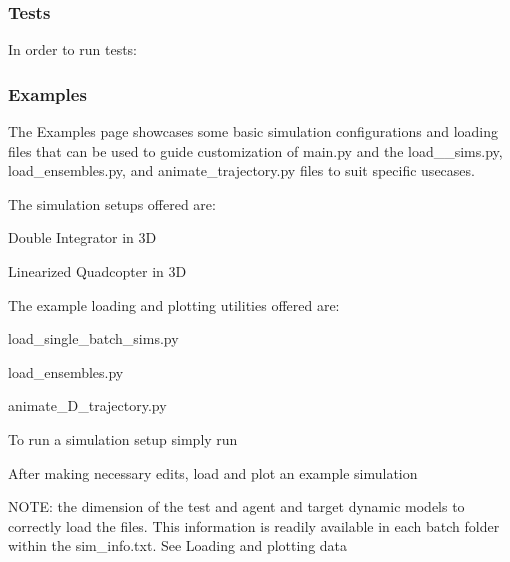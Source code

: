 \subsubsection*{Tests}

In order to run tests\+:


\begin{DoxyCode}{0}
\end{DoxyCode}


\subsubsection*{Examples}

The Examples page showcases some basic simulation configurations and loading files that can be used to guide customization of main.\+py and the load\+\_\+\+\_\+sims.\+py, load\+\_\+ensembles.\+py, and animate\+\_\+trajectory.\+py files to suit specific usecases.

The simulation setups offered are\+:
\begin{DoxyItemize}
\item Double Integrator in 3D
\item Linearized Quadcopter in 3D
\end{DoxyItemize}

The example loading and plotting utilities offered are\+:
\begin{DoxyItemize}
\item load\+\_\+single\+\_\+batch\+\_\+sims.\+py
\item load\+\_\+ensembles.\+py
\item animate\+\_\+D\+\_\+trajectory.\+py
\end{DoxyItemize}

To run a simulation setup simply run 
\begin{DoxyCode}{0}
\end{DoxyCode}


After making necessary edits, load and plot an example simulation 
\begin{DoxyCode}{0}
\end{DoxyCode}


N\+O\+TE\+: the dimension of the test and agent and target dynamic models to correctly load the files. This information is readily available in each batch folder within the sim\+\_\+info.\+txt. See \textquotesingle{}Loading and plotting data\textquotesingle{}

